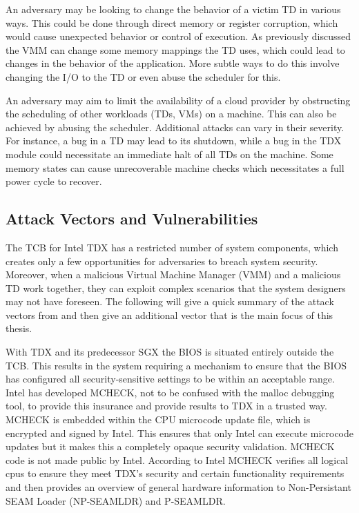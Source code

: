 
An adversary may be looking to change the behavior of a victim TD in various ways. This could be done through direct memory or register corruption, which would cause unexpected behavior or control of execution. As previously discussed the VMM can change some memory mappings the TD uses, which could lead to changes in the behavior of the application. More subtle ways to do this involve changing the I/O to the TD or even abuse the scheduler for this. 


An adversary may aim to limit the availability of a cloud provider by obstructing the scheduling of other workloads (TDs, VMs) on a machine. This can also be achieved by abusing the scheduler. Additional attacks can vary in their severity. For instance, a bug in a TD may lead to its shutdown, while a bug in the TDX module could necessitate an immediate halt of all TDs on the machine. Some memory states can cause unrecoverable machine checks which necessitates a full power cycle to recover\cite{aktas_intel_nodate}.

\subsection{Attack Vectors and Vulnerabilities}

The TCB for Intel TDX has a restricted number of system components, which creates only a few opportunities for adversaries to breach system security. Moreover, when a malicious Virtual Machine Manager (VMM) and a malicious TD work together, they can exploit complex scenarios that the system designers may not have foreseen. The following will give a quick summary of the attack vectors from \cite{aktas_intel_nodate} and then give an additional vector that is the main focus of this thesis.  



With TDX and its predecessor SGX the BIOS is situated entirely outside the TCB. This results in the system requiring a mechanism to ensure that the BIOS has configured all security-sensitive settings to be within an acceptable range. Intel has developed MCHECK, not to be confused with the malloc debugging tool, to provide this insurance and provide results to TDX in a trusted way.  MCHECK is embedded within the CPU microcode update file, which is encrypted and signed by Intel. This ensures that only Intel can execute microcode updates but it makes this a completely opaque security validation. MCHECK code is not made public by Intel. According to Intel MCHECK verifies \guillemotright all logical cpus to ensure they meet TDX's security and certain functionality requirements \guillemotleft\cite[p.~50]{noauthor_tdx-module-10-public-specpdf_nodate} and then provides an overview of general hardware information to Non-Persistant SEAM Loader (NP-SEAMLDR) and P-SEAMLDR. 

